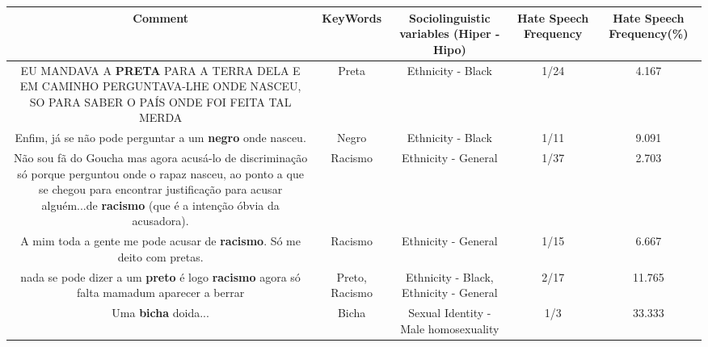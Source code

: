 \documentclass[11pt]{article}
\newlength\mylength
\begin{document}
\begin{center}
\setlength\mylength{\dimexpr\textwidth - 1\arrayrulewidth - 50\tabcolsep}
\begin{longtable}{|C{.65\mylength}|C{.30\mylength}|C{.12\mylength}|C{.12\mylength}|C{.12\mylength}|}
\hline
\textbf{Comment} & \textbf{KeyWords} & \textbf{Sociolinguistic variables (Hiper - Hipo)}  & \textbf{Hate Speech Frequency} & \textbf{Hate Speech Frequency(\%)} \\
\hline{}\small EU MANDAVA A \textbf{PRETA} PARA A TERRA DELA E EM CAMINHO PERGUNTAVA-LHE ONDE NASCEU, SO PARA SABER O PAÍS ONDE FOI FEITA TAL MERDA\normalsize   & Preta & Ethnicity - Black & 1/24 & 4.167 \\  \hline
  \small Enfim, já se não pode perguntar a um \textbf{negro} onde nasceu.\normalsize   & Negro & Ethnicity - Black & 1/11 & 9.091 \\  \hline
  \small Não sou fã do Goucha mas agora acusá-lo de discriminação só porque perguntou onde o rapaz nasceu, ao ponto a que se chegou para encontrar justificação para acusar alguém...de \textbf{racismo} (que é a intenção óbvia da acusadora).\normalsize   & Racismo & Ethnicity - General & 1/37 & 2.703 \\  \hline
  \small A mim toda a gente me pode acusar de \textbf{racismo}. Só me deito com pretas.\normalsize   & Racismo & Ethnicity - General & 1/15 & 6.667 \\  \hline
  \small nada se pode dizer a um \textbf{preto}  é  logo \textbf{racismo}  agora só falta  mamadum  aparecer  a berrar\normalsize   & Preto, Racismo & Ethnicity - Black, Ethnicity - General & 2/17 & 11.765 \\  \hline
  \small Uma \textbf{bicha} doida...\normalsize   & Bicha & Sexual Identity - Male homosexuality & 1/3 & 33.333 \\  \hline
  
\end{longtable}
\end{center}
\end{document}
